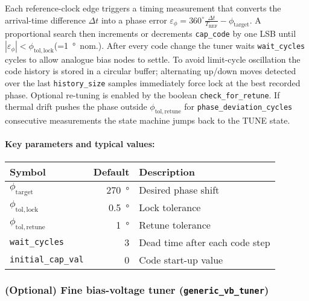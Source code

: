 Each reference-clock edge triggers a timing measurement that converts the arrival-time difference
\(\Delta t\) into a phase error
\(\varepsilon_\phi = 360^\circ \tfrac{\Delta t}{T_{\mathrm{REF}}}-\phi_\mathrm{target}\).
A proportional search then increments or decrements \texttt{cap\_code} by one LSB
until \(|\varepsilon_\phi|<\phi_\mathrm{tol,lock}\)\;(=\SI{1}{\degree}~nom.).
After every code change the tuner waits \texttt{wait\_cycles} cycles to allow analogue bias nodes to settle.
To avoid limit-cycle oscillation the code history is stored in a circular buffer; alternating up/down moves
detected over the last \texttt{history\_size} samples immediately force lock at the best recorded phase.
Optional re-tuning is enabled by the boolean \texttt{check\_for\_retune}.
If thermal drift pushes the phase outside \(\phi_\mathrm{tol,retune}\) for
\texttt{phase\_deviation\_cycles} consecutive measurements the state machine jumps back to the TUNE state.

\paragraph{Key parameters and typical values:}

\begin{center}
\begin{tabular}{@{}lrl@{}}
\toprule
Symbol & Default & Description\\
\midrule
\(\phi_\mathrm{target}\)              & \SI{270}{\degree} & Desired phase shift\\
\(\phi_\mathrm{tol,lock}\)            & \SI{0.5}{\degree} & Lock tolerance\\
\(\phi_\mathrm{tol,retune}\)          & \SI{1}{\degree}   & Retune tolerance \\[2pt]
\texttt{wait\_cycles}                 & 3                 & Dead time after each code step\\
\texttt{initial\_cap\_val}            & 0                 & Code start-up value\\
\bottomrule
\end{tabular}
\end{center}

\subsubsection{(Optional) Fine bias-voltage tuner (\texttt{generic\_vb\_tuner})}
